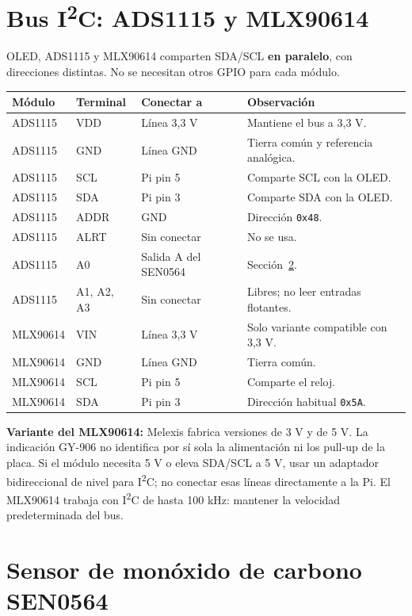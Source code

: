 \documentclass[11pt,a4paper]{article}
\newcommand{\iic}{I\textsuperscript{2}C}
\begin{document}
\section{Bus \texorpdfstring{I\textsuperscript{2}C}{I2C}: ADS1115 y MLX90614}

OLED, ADS1115 y MLX90614 comparten SDA/SCL \textbf{en paralelo}, con
direcciones distintas. No se necesitan otros GPIO para cada módulo.

\begin{center}
\begin{tabularx}{\linewidth}{lllX}
\toprule
\textbf{Módulo} & \textbf{Terminal} & \textbf{Conectar a} & \textbf{Observación}\\
\midrule
ADS1115 & VDD & Línea 3,3 V & Mantiene el bus a 3,3 V.\\
ADS1115 & GND & Línea GND & Tierra común y referencia analógica.\\
ADS1115 & SCL & Pi pin 5 & Comparte SCL con la OLED.\\
ADS1115 & SDA & Pi pin 3 & Comparte SDA con la OLED.\\
ADS1115 & ADDR & GND & Dirección \texttt{0x48}.\\
ADS1115 & ALRT & Sin conectar & No se usa.\\
ADS1115 & A0 & Salida A del SEN0564 & Sección~\ref{sec:co}.\\
ADS1115 & A1, A2, A3 & Sin conectar & Libres; no leer entradas flotantes.\\
MLX90614 & VIN & Línea 3,3 V & Solo variante compatible con 3,3 V.\\
MLX90614 & GND & Línea GND & Tierra común.\\
MLX90614 & SCL & Pi pin 5 & Comparte el reloj.\\
MLX90614 & SDA & Pi pin 3 & Dirección habitual \texttt{0x5A}.\\
\bottomrule
\end{tabularx}
\end{center}

\textbf{Variante del MLX90614:} Melexis fabrica versiones de 3 V y de 5 V. La
indicación GY-906 no identifica por sí sola la alimentación ni los pull-up de la
placa. Si el módulo necesita 5 V o eleva SDA/SCL a 5 V, usar un adaptador
bidireccional de nivel para \iic; no conectar esas líneas directamente a la
Pi.\cite{mlx} El MLX90614 trabaja con \iic{} de hasta 100 kHz: mantener la
velocidad predeterminada del bus.

\section{Sensor de monóxido de carbono SEN0564}
\label{sec:co}
\end{document}
